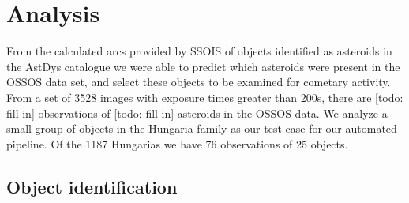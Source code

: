 \documentclass[iop,apj]{emulateapj}
\begin{document}

\section{Analysis}

From the calculated arcs provided by SSOIS \citep{ssois} of objects identified as asteroids in the AstDys catalogue \citep{astdys} we were able to predict which asteroids were present in the OSSOS data set, and select these objects to be examined for cometary activity. From a set of 3528 images with exposure times greater than 200s, there are [todo: fill in] observations of [todo: fill in] asteroids in the OSSOS data. We analyze a small group of objects in the Hungaria family as our test case for our automated pipeline. Of the 1187 Hungarias we have 76 observations of 25 objects. 

\subsection{Object identification}
\end{document}
